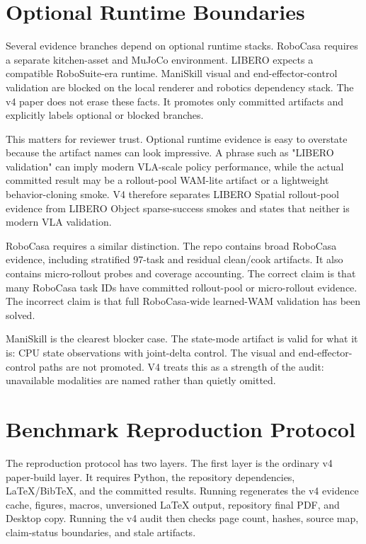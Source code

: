 \section{Optional Runtime Boundaries}
\label{app:optional-runtime}

Several evidence branches depend on optional runtime stacks. RoboCasa requires
a separate kitchen-asset and MuJoCo environment. LIBERO expects a compatible
RoboSuite-era runtime. ManiSkill visual and end-effector-control validation are
blocked on the local renderer and robotics dependency stack. The v4 paper does
not erase these facts. It promotes only committed artifacts and explicitly
labels optional or blocked branches.

This matters for reviewer trust. Optional runtime evidence is easy to
overstate because the artifact names can look impressive. A phrase such as
"LIBERO validation" can imply modern VLA-scale policy performance, while the
actual committed result may be a rollout-pool WAM-lite artifact or a
lightweight behavior-cloning smoke. V4 therefore separates LIBERO Spatial
rollout-pool evidence from LIBERO Object sparse-success smokes and states that
neither is modern VLA validation.

RoboCasa requires a similar distinction. The repo contains broad RoboCasa
evidence, including stratified 97-task and residual clean/cook artifacts. It
also contains micro-rollout probes and coverage accounting. The correct claim
is that many RoboCasa task IDs have committed rollout-pool or micro-rollout
evidence. The incorrect claim is that full RoboCasa-wide learned-WAM validation
has been solved.

ManiSkill is the clearest blocker case. The state-mode artifact is valid for
what it is: CPU state observations with joint-delta control. The visual and
end-effector-control paths are not promoted. V4 treats this as a strength of
the audit: unavailable modalities are named rather than quietly omitted.

\section{Benchmark Reproduction Protocol}
\label{app:benchmark-reproduction}

The reproduction protocol has two layers. The first layer is the ordinary v4
paper-build layer. It requires Python, the repository dependencies,
\LaTeX{}/BibTeX, and the committed results. Running
 regenerates the v4 evidence cache,
figures, macros, unversioned \LaTeX{} output, repository final PDF, and Desktop
copy. Running the v4 audit then checks page count, hashes, source map,
claim-status boundaries, and stale artifacts.

